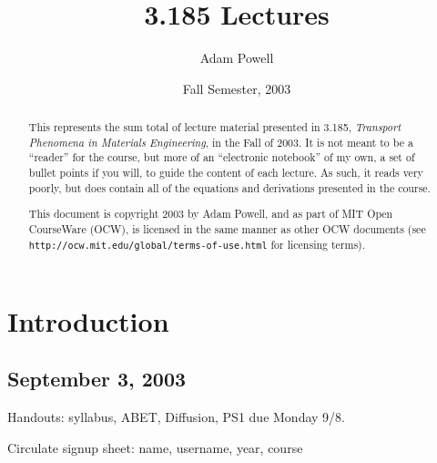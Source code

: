 \documentclass{report}
\begin{document}
\title{3.185 Lectures}
\author{Adam Powell}
\date{Fall Semester, 2003}
\maketitle

\begin{abstract}
  This represents the sum total of lecture material presented in 3.185, {\em
    Transport Phenomena in Materials Engineering}, in the Fall of 2003.  It is
  not meant to be a ``reader'' for the course, but more of an ``electronic
  notebook'' of my own, a set of bullet points if you will, to guide the
  content of each lecture.  As such, it reads very poorly, but does contain all
  of the equations and derivations presented in the course.

  This document is copyright 2003 by Adam Powell, and as part of MIT Open
  CourseWare (OCW), is licensed in the same manner as other OCW documents (see
  {\tt http://ocw.mit.edu/global/terms-of-use.html} for licensing terms).
\end{abstract}

\tableofcontents

\chapter{Introduction}

\section{September 3, 2003}

Handouts: syllabus, ABET, Diffusion, PS1 due Monday 9/8.

Circulate signup sheet: name, username, year, course
\end{document}
